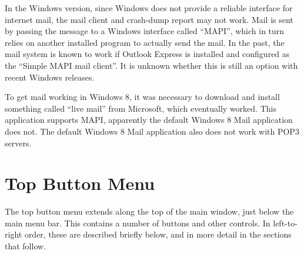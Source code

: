 In the Windows version, since Windows does not provide a reliable
interface for internet mail, the mail client and crash-dump report may
not work.  Mail is sent by passing the message to a Windows interface
called ``MAPI'', which in turn relies on another installed program to
actually send the mail.  In the past, the mail system is known to work
if Outlook Express is installed and configured as the ``Simple MAPI
mail client''.  It is unknown whether this is still an option with
recent Windows releases.

To get mail working in Windows 8, it was necessary to download and
install something called ``{\cb live mail}'' from Microsoft, which
eventually worked.  This application supports MAPI, apparently the
default Windows 8 Mail application does not.  The default Windows 8
Mail application also does not work with POP3 servers.


\section{Top Button Menu}
\label{topbuttons}
The top button menu extends along the top of the {\Xic} main window,
just below the main menu bar.  This contains a number of buttons and
other controls.  In left-to-right order, these are described briefly
below, and in more detail in the sections that follow.

